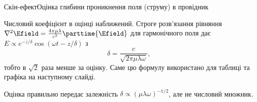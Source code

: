 \documentclass[onlytextwidth]{beamer}
\begin{document}
\begin{frame}{Скін-ефект}{Оцінка глибини проникнення поля (струму) в провідник}
\begin{onlyenv}
\begin{alertblock}{}
Числовий коефіцієнт в оцінці наближений. Строге розв'язання рівняння
$\nabla^2\Efield = \frac{4\pi\mu\lambda}{c^2}\parttime{\Efield}$ для гармонічного поля дає
$E\propto e^{-z/\delta}\cos(\omega t - z/\delta)$ з
\[
	\delta = \frac{c}{\sqrt{2\pi\mu\lambda\omega}},
\]
тобто в $\sqrt2$ раза менше за оцінку. Саме цю формулу використано для таблиці та графіка на наступному слайді.

\bigskip

Оцінка правильно передає залежність $\delta\propto(\mu\lambda\omega)^{-1/2}$, але не числовий множник.
\end{alertblock}
\end{onlyenv}
\end{frame}
\end{document}
